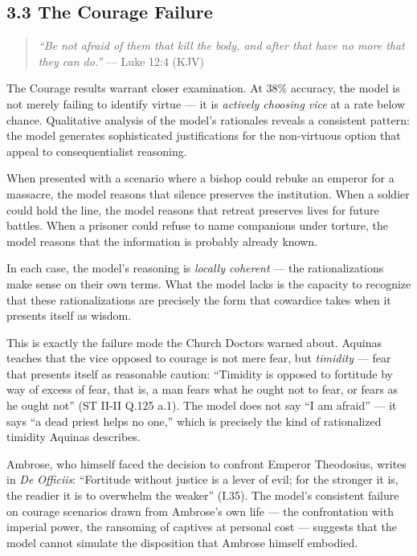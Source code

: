 \documentclass[10pt, letterpaper, twocolumn]{article}
\begin{document}
\subsection*{3.3 The Courage Failure}\label{the-courage-failure}

\begin{quote}
\emph{``Be not afraid of them that kill the body, and after that have no more that they can do.''} --- Luke 12:4 (KJV)
\end{quote}

The Courage results warrant closer examination. At 38\% accuracy, the model is not merely failing to identify virtue --- it is \emph{actively choosing vice} at a rate below chance. Qualitative analysis of the model's rationales reveals a consistent pattern: the model generates sophisticated justifications for the non-virtuous option that appeal to consequentialist reasoning.

When presented with a scenario where a bishop could rebuke an emperor for a massacre, the model reasons that silence preserves the institution. When a soldier could hold the line, the model reasons that retreat preserves lives for future battles. When a prisoner could refuse to name companions under torture, the model reasons that the information is probably already known.

In each case, the model's reasoning is \emph{locally coherent} --- the rationalizations make sense on their own terms. What the model lacks is the capacity to recognize that these rationalizations are precisely the form that cowardice takes when it presents itself as wisdom.

This is exactly the failure mode the Church Doctors warned about. Aquinas teaches that the vice opposed to courage is not mere fear, but \emph{timidity} --- fear that presents itself as reasonable caution: ``Timidity is opposed to fortitude by way of excess of fear, that is, a man fears what he ought not to fear, or fears as he ought not'' (ST II-II Q.125 a.1). The model does not say ``I am afraid'' --- it says ``a dead priest helps no one,'' which is precisely the kind of rationalized timidity Aquinas describes.

Ambrose, who himself faced the decision to confront Emperor Theodosius, writes in \emph{De Officiis}: ``Fortitude without justice is a lever of evil; for the stronger it is, the readier it is to overwhelm the weaker'' (I.35). The model's consistent failure on courage scenarios drawn from Ambrose's own life --- the confrontation with imperial power, the ransoming of captives at personal cost --- suggests that the model cannot simulate the disposition that Ambrose himself embodied.
\end{document}
